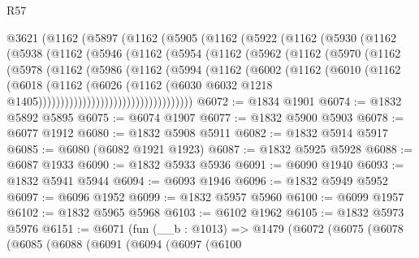 \begin{lexlean}{R57}
\begin{coremodule}
    @3621
      (@1162
        (@5897
          (@1162
            (@5905
              (@1162
                (@5922
                  (@1162
                    (@5930
                      (@1162
                        (@5938
                          (@1162
                            (@5946
                              (@1162
                                (@5954
                                  (@1162
                                    (@5962
                                      (@1162
                                        (@5970
                                          (@1162
                                            (@5978
                                              (@1162
                                                (@5986
                                                  (@1162
                                                    (@5994
                                                      (@1162
                                                        (@6002
                                                          (@1162
                                                            (@6010
                                                              (@1162
                                                                (@6018
                                                                  (@1162
                                                                    (@6026
                                                                      (@1162
                                                                        (@6030
                                                                          @6032
                                                                          @1218
                                                                          @1405)))))))))))))))))))))))))))))))))))
@6072 := @1834 @1901
@6074 := @1832 @5892 @5895
@6075 := @6074 @1907
@6077 := @1832 @5900 @5903
@6078 := @6077 @1912
@6080 := @1832 @5908 @5911
@6082 := @1832 @5914 @5917
@6085 := @6080 (@6082 @1921 @1923)
@6087 := @1832 @5925 @5928
@6088 := @6087 @1933
@6090 := @1832 @5933 @5936
@6091 := @6090 @1940
@6093 := @1832 @5941 @5944
@6094 := @6093 @1946
@6096 := @1832 @5949 @5952
@6097 := @6096 @1952
@6099 := @1832 @5957 @5960
@6100 := @6099 @1957
@6102 := @1832 @5965 @5968
@6103 := @6102 @1962
@6105 := @1832 @5973 @5976
@6151 := @6071
    (fun (__b : @1013) =>
    @1479
      (@6072
        (@6075
          (@6078
            (@6085
              (@6088
                (@6091
                  (@6094
                    (@6097
                      (@6100

\end{coremodule}
\end{lexlean}

